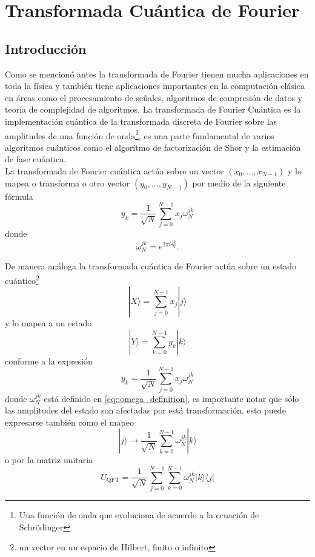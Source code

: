\documentclass[a4paper]{article}
\begin{document}
\section{Transformada Cuántica de Fourier}
\subsection{Introducción}
Como se mencionó antes la transformada de Fourier tienen mucha aplicaciones en toda la física y también tiene aplicaciones importantes en la computación clásica en áreas como el procesamiento de señales, algoritmos de compresión de datos y teoría de complejidad de algoritmos. La transformada de Fourier Cuántica es la implementación cuántica de la transformada discreta de Fourier sobre las amplitudes de una función de onda\footnote{Una función de onda que evoluciona de acuerdo a la ecuación de Schr\"{o}dinger}, es una parte fundamental de varios algoritmos cuánticos  como el algoritmo de factorización de Shor y la estimación de fase cuántica.\\
La transformada de Fourier cuántica actúa sobre un vector $(x_0, \hdots, x_{N-1})$ y lo mapea o transforma o otro vector
$(y_0, \hdots, y_{N-1})$ por medio de la siguiente fórmula
\begin{equation}
y_{k}=\frac{1}{\sqrt{N}}\sum_{j=0}^{N-1}x_j \omega_{N}^{jk}
\end{equation}
donde 
\begin{equation}\label{eq::omega_definition}
\omega_{N}^{jk}=e^{2\pi i \frac{jk}{N}}.
\end{equation}

De manera análoga la transformada cuántica de Fourier actúa sobre un estado cuántico\footnote{un vector en un espacio de Hilbert, finito o infinito} 
\begin{equation}
|X\rangle=\sum_{j=0}^{N-1} x_{j}|j\rangle
\end{equation}
y lo mapea a un estado 
\begin{equation}\label{eq::QFT_general}
|Y\rangle=\sum_{k=0}^{N-1} y_{k}|k\rangle
\end{equation}
conforme a la expresión
\begin{equation}
y_k=\frac{1}{\sqrt{N}}\sum_{j=0}^{N-1}x_j\omega_{N}^{jk}
\end{equation}
donde $\omega_{N}^{jk}$ está definido en \ref{eq::omega_definition}, es importante notar que sólo las amplitudes del estado son afectadas por está transformación, esto puede expresarse también como el mapeo
\begin{equation}
|j\rangle \rightarrow \frac{1}{\sqrt{N}}\sum^{N-1}_{k=0}\omega_N^{jk}|k\rangle
\end{equation}
o por la matriz unitaria
\begin{equation}
U_{\text{QFT}}=\frac{1}{\sqrt{N}}\sum_{j=0}^{N-1}\sum_{k=0}^{N-1}\omega_{N}^{jk}|k\rangle\langle j|
\end{equation}
\end{document}

